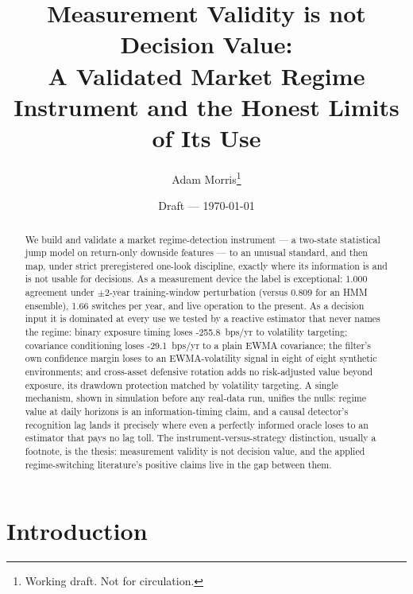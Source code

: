 \documentclass[11pt]{article}
\title{Measurement Validity is not Decision Value:\\
       A Validated Market Regime Instrument and the Honest Limits of Its Use}
\author{Adam Morris\thanks{Working draft. Not for circulation.}}
\date{Draft --- \today}
\newif\ifreview
\newcommand{\aidraft}[1]{{\color{aidraftcolor}#1}} %
\newcommand{\aidraft}[1]{#1}
\newcommand{\stabJM}{1.000}          %
\newcommand{\stabHMM}{0.809}         %
\newcommand{\switchesYr}{1.66}
\newcommand{\feeJMVT}{-255.8}
\newcommand{\feeBreact}{-29.1}
\newcommand{\dgpCells}{eight of eight}
\begin{document}
\maketitle

\ifreview
  \begin{center}\small\itshape
  Review render: blue text is AI-drafted and awaiting your edit; margin notes are action items.
  Flip \texttt{\textbackslash reviewtrue} to \texttt{\textbackslash reviewfalse} in main.tex for a clean PDF.
  \end{center}
  \listoftodos
  \clearpage
\fi

\begin{abstract}
\aidraft{%
We build and validate a market regime-detection instrument --- a two-state statistical jump
model on return-only downside features --- to an unusual standard, and then map, under strict
preregistered one-look discipline, exactly where its information is and is not usable for
decisions.
As a measurement device the label is exceptional: \stabJM{} agreement under $\pm 2$-year
training-window perturbation (versus \stabHMM{} for an HMM ensemble), \switchesYr{} switches
per year, and live operation to the present.
As a decision input it is dominated at every use we tested by a reactive estimator that never
names the regime: binary exposure timing loses \feeJMVT{}~bps/yr to volatility targeting;
covariance conditioning loses \feeBreact{}~bps/yr to a plain EWMA covariance; the filter's own
confidence margin loses to an EWMA-volatility signal in \dgpCells{} synthetic environments; and
cross-asset defensive rotation adds no risk-adjusted value beyond exposure, its drawdown
protection matched by volatility targeting.
A single mechanism, shown in simulation before any real-data run, unifies the nulls: regime
value at daily horizons is an information-timing claim, and a causal detector's recognition lag
lands it precisely where even a perfectly informed oracle loses to an estimator that pays no
lag toll.
The instrument-versus-strategy distinction, usually a footnote, is the thesis: measurement
validity is not decision value, and the applied regime-switching literature's positive claims
live in the gap between them.%
}
\end{abstract}


\section{Introduction}
\label{sec:intro}
\end{document}
